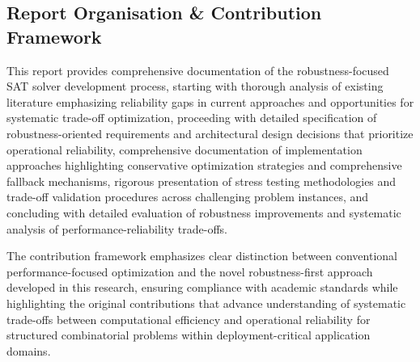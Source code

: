 \subsection{Report Organisation \& Contribution Framework}

This report provides comprehensive documentation of the robustness-focused SAT solver development process, starting with thorough analysis of existing literature emphasizing reliability gaps in current approaches and opportunities for systematic trade-off optimization, proceeding with detailed specification of robustness-oriented requirements and architectural design decisions that prioritize operational reliability, comprehensive documentation of implementation approaches highlighting conservative optimization strategies and comprehensive fallback mechanisms, rigorous presentation of stress testing methodologies and trade-off validation procedures across challenging problem instances, and concluding with detailed evaluation of robustness improvements and systematic analysis of performance-reliability trade-offs.

The contribution framework emphasizes clear distinction between conventional performance-focused optimization and the novel robustness-first approach developed in this research, ensuring compliance with academic standards while highlighting the original contributions that advance understanding of systematic trade-offs between computational efficiency and operational reliability for structured combinatorial problems within deployment-critical application domains.